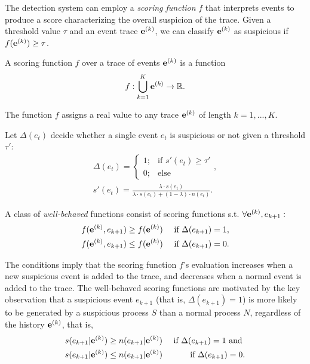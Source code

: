 The detection system can employ a \emph{scoring function} $f$ that interprets events to produce a score characterizing the overall suspicion of the trace. Given a threshold value $\tau$ and an event trace $\mathbf{e}^{\scriptsize(k)}$, we can classify $\mathbf{e}^{\scriptsize(k)}$ as suspicious if $f(\mathbf{e}^{\scriptsize(k)}) \geq \tau$.
\begin{definition}
	A scoring function $f$ over a trace of events $\mathbf{e}^{\scriptsize(k)}$ is a function
	$$
	f: \bigcup_{k=1}^{K} \mathbf{e}^{\scriptsize(k)} \rightarrow  \mathbb{R}.
	$$
\end{definition}
The function $f$ assigns a real value to any trace $\mathbf{e}^{\scriptsize(k)}$ of length $k=1,...,K$. 

\noindent
Let $\Delta(e_t)$ decide whether a single event $e_t$ is suspicious or not given a threshold $\tau'$:
\begin{eqnarray}
\label{eq:delta}
        \Delta(e_t) = 
			\begin{cases}
		   1; & \text{if } {s'}(e_t) \geq {\tau'} \\
		   0; & \text{else }
		  \end{cases},\\
		{s'}(e_t)=\frac{\lambda \cdot {s}(e_t)}{\lambda \cdot {s}(e_t) + (1-\lambda) \cdot {n}(e_t)}.
\end{eqnarray}

\begin{definition}
A class of \emph{well-behaved} functions consist of scoring functions s.t. $\forall \mathbf{e}^{\scriptsize(k)}, e_{k+1}:$
\begin{eqnarray*}
f( \mathbf{e}^{\scriptsize(k)}, e_{k+1} ) \geq f(\mathbf{e}^{\scriptsize(k)}) &&\textrm{ if } \Delta(e_{k+1}) = 1, \\
f( \mathbf{e}^{\scriptsize(k)}, e_{k+1} ) \leq f(\mathbf{e}^{\scriptsize(k)}) &&\textrm{ if } \Delta(e_{k+1}) = 0.
\end{eqnarray*}
\end{definition}
\noindent The conditions imply that the scoring function $f$'s evaluation increases when a new suspicious event is added to the trace, and decreases when a normal event is added to the trace. The well-behaved scoring functions are motivated by the key observation that a suspicious event $e_{k+1}$ (that is, $\Delta(e_{k+1})=1$) is more likely to be generated by a suspicious process $S$ than a normal process $N$, regardless of the history $\mathbf{e}^{\scriptsize(k)}$, that is, 
\begin{eqnarray*}
s(e_{k+1}|\mathbf{e}^{\scriptsize(k)}) \geq n(e_{k+1}|\mathbf{e}^{\scriptsize(k)}) &&\textrm{ if } \Delta(e_{k+1})=1 \textrm{ and }\\
s(e_{k+1}|\mathbf{e}^{\scriptsize(k)}) \leq n(e_{k+1}|\mathbf{e}^{\scriptsize(k)}) &&\textrm{ if } \Delta(e_{k+1})=0.
\end{eqnarray*}

